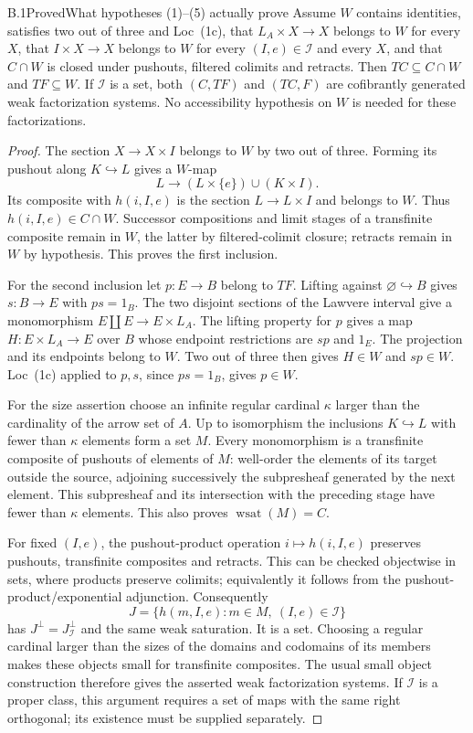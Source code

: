 \begin{claim}{B.1}{Proved}{What hypotheses (1)--(5) actually prove}\label{B1}
Assume $W$ contains identities, satisfies two out of three and
Loc~(1c), that $L_A\times X\to X$ belongs to $W$ for
every $X$, that $I\times X\to X$ belongs to $W$ for every $(I,e)\in\mathcal I$
and every $X$, and that $C\cap W$ is closed under pushouts, filtered colimits
and retracts.  Then $TC\subseteq C\cap W$ and $TF\subseteq W$.  If
$\mathcal I$ is a set, both $(C,TF)$ and $(TC,F)$ are cofibrantly generated
weak factorization systems.  No accessibility hypothesis on $W$ is needed
for these factorizations.
\end{claim}
\begin{proof}
The section $X\to X\times I$ belongs to $W$ by two out of three.  Forming its
pushout along $K\hookrightarrow L$ gives a $W$-map
\[
 L\longrightarrow (L\times\{e\})\cup(K\times I).
\]
Its composite with $h(i,I,e)$ is the section $L\to L\times I$ and belongs
to $W$.  Thus $h(i,I,e)\in C\cap W$.  Successor compositions and limit stages
of a transfinite composite remain in $W$, the latter by filtered-colimit
closure; retracts remain in $W$ by hypothesis.  This proves the first
inclusion.

For the second inclusion let $p:E\to B$ belong to $TF$.  Lifting against
$\varnothing\hookrightarrow B$ gives $s:B\to E$ with $ps=1_B$.
The two disjoint sections of the Lawvere interval give a monomorphism
$E\amalg E\to E\times L_A$.  The lifting property for $p$ gives a map
$H:E\times L_A\to E$ over $B$ whose endpoint restrictions are $sp$ and
$1_E$.  The projection and its endpoints belong to $W$.  Two out of three
then gives $H\in W$ and $sp\in W$.  Loc~(1c) applied to $p,s$, since
$ps=1_B$, gives $p\in W$.

For the size assertion choose an infinite regular cardinal $\kappa$ larger
than the cardinality of the arrow set of $A$.  Up to isomorphism the inclusions
$K\hookrightarrow L$ with fewer than $\kappa$ elements form a set $M$.
Every monomorphism is a transfinite composite of pushouts of elements of
$M$: well-order the elements of its target outside the source, adjoining
successively the subpresheaf generated by the next element.  This
subpresheaf and its intersection with the preceding stage have fewer than
$\kappa$ elements.  This also proves $\operatorname{wsat}(M)=C$.

For fixed $(I,e)$, the pushout-product operation $i\mapsto h(i,I,e)$
preserves pushouts, transfinite composites and retracts.  This can be checked
objectwise in sets, where products preserve colimits; equivalently it follows
from the pushout-product/exponential adjunction.  Consequently
\[
 J=\{h(m,I,e):m\in M,\ (I,e)\in\mathcal I\}
\]
has $J^{\perp}=J_{\mathcal I}^{\perp}$ and the same weak saturation.
It is a set.  Choosing a regular cardinal larger than the sizes of the domains
and codomains of its members makes these objects small for transfinite
composites.  The usual small object construction therefore gives the asserted
weak factorization systems.  If $\mathcal I$ is a proper class, this argument
requires a set of maps with the same right orthogonal; its existence must be
supplied separately.
\end{proof}

